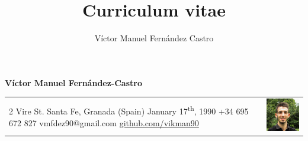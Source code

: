 \documentclass[12pt,a4paper]{article}
\title{Curriculum vitae}
\author{Víctor Manuel Fernández Castro}
\begin{document}
	\large
	
	\begin{center}
		\textbf{Víctor Manuel Fernández-Castro}
	\end{center}
	
	\normalsize
	\centering

	\begin{tabular}{m{}m{}}
		2 Vire St. \newline
		Santa Fe, Granada (Spain) \newline
		January 17\textsuperscript{th}, 1990 \newline
		\newline
		+34 695 672 827 \newline
		vmfdez90@gmail.com \newline
		\href{https://github.com/vikman90}{github.com/vikman90} &
		\includegraphics[width=3cm]{victor}
	\end{tabular}
	
	
\end{document}
